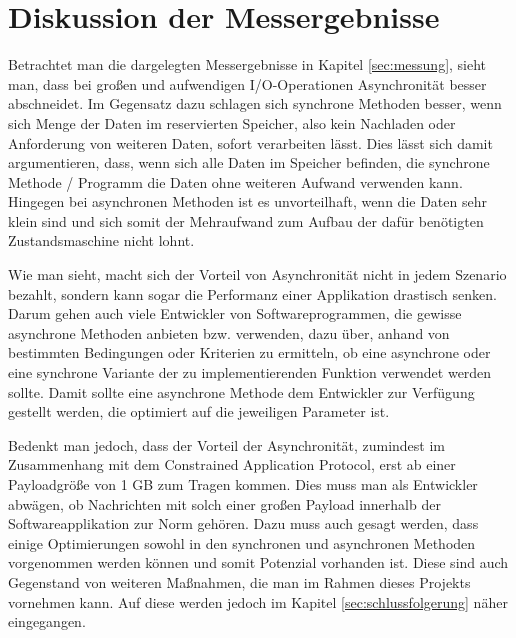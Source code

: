 \section{Diskussion der Messergebnisse}
\label{sec:diskussion-der-messergebnisse}

Betrachtet man die dargelegten Messergebnisse in Kapitel \ref{sec:messung}, sieht man, dass bei großen und aufwendigen I/O-Operationen Asynchronität besser abschneidet. Im Gegensatz dazu schlagen sich synchrone Methoden besser, wenn sich Menge der Daten im reservierten Speicher, also kein Nachladen oder Anforderung von weiteren Daten, sofort verarbeiten lässt. Dies lässt sich damit argumentieren, dass, wenn sich alle Daten im Speicher befinden, die synchrone Methode / Programm die Daten ohne weiteren Aufwand verwenden kann. Hingegen bei asynchronen Methoden ist es unvorteilhaft, wenn die Daten sehr klein sind und sich somit der Mehraufwand zum Aufbau der dafür benötigten Zustandsmaschine nicht lohnt.

Wie man sieht, macht sich der Vorteil von Asynchronität nicht in jedem Szenario bezahlt, sondern kann sogar die Performanz einer Applikation drastisch senken. Darum gehen auch viele Entwickler von Softwareprogrammen, die gewisse asynchrone Methoden anbieten bzw. verwenden, dazu über, anhand von bestimmten Bedingungen oder Kriterien zu ermitteln, ob eine asynchrone oder eine synchrone Variante der zu implementierenden Funktion verwendet werden sollte. Damit sollte eine asynchrone Methode dem Entwickler zur Verfügung gestellt werden, die optimiert auf die jeweiligen Parameter ist.

Bedenkt man jedoch, dass der Vorteil der Asynchronität, zumindest im Zusammenhang mit dem Constrained Application Protocol, erst ab einer Payloadgröße von 1 GB zum Tragen kommen. Dies muss man als Entwickler abwägen, ob Nachrichten mit solch einer großen Payload innerhalb der Softwareapplikation zur Norm gehören. Dazu muss auch gesagt werden, dass einige Optimierungen sowohl in den synchronen und asynchronen Methoden vorgenommen werden können und somit Potenzial vorhanden ist. Diese sind auch Gegenstand von weiteren Maßnahmen, die man im Rahmen dieses Projekts vornehmen kann. Auf diese werden jedoch im Kapitel \ref{sec:schlussfolgerung} näher eingegangen.